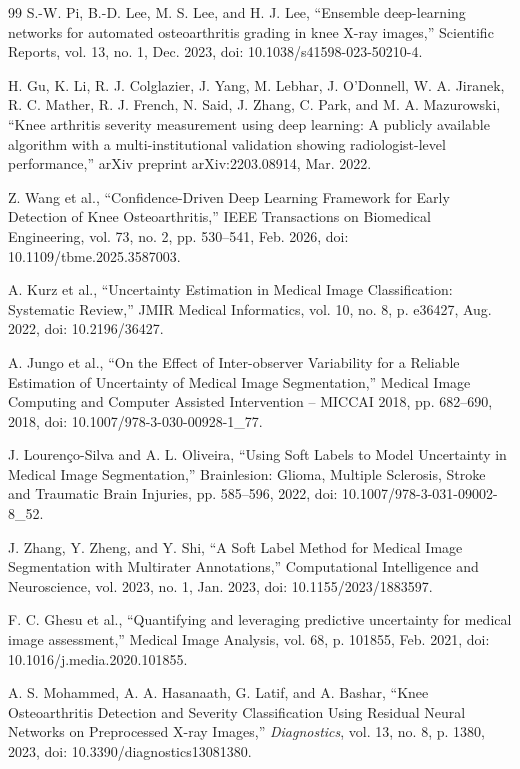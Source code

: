 \documentclass[letterpaper, 10 pt, conference]{ieeeconf}  %
\begin{document}
\begin{thebibliography}{99}
 S.-W. Pi, B.-D. Lee, M. S. Lee, and H. J. Lee, “Ensemble deep-learning networks for automated osteoarthritis grading in knee X-ray images,” Scientific Reports, vol. 13, no. 1, Dec. 2023, doi: 10.1038/s41598-023-50210-4.

 H. Gu, K. Li, R. J. Colglazier, J. Yang, M. Lebhar, J. O’Donnell, W. A. Jiranek, R. C. Mather, R. J. French, N. Said, J. Zhang, C. Park, and M. A. Mazurowski, “Knee arthritis severity measurement using deep learning: A publicly available algorithm with a multi-institutional validation showing radiologist-level performance,” arXiv preprint arXiv:2203.08914, Mar. 2022.

 Z. Wang et al., “Confidence-Driven Deep Learning Framework for Early Detection of Knee Osteoarthritis,” IEEE Transactions on Biomedical Engineering, vol. 73, no. 2, pp. 530–541, Feb. 2026, doi: 10.1109/tbme.2025.3587003.

 A. Kurz et al., “Uncertainty Estimation in Medical Image Classification: Systematic Review,” JMIR Medical Informatics, vol. 10, no. 8, p. e36427, Aug. 2022, doi: 10.2196/36427.

 A. Jungo et al., “On the Effect of Inter-observer Variability for a Reliable Estimation of Uncertainty of Medical Image Segmentation,” Medical Image Computing and Computer Assisted Intervention – MICCAI 2018, pp. 682–690, 2018, doi: 10.1007/978-3-030-00928-1\_77.

 J. Lourenço-Silva and A. L. Oliveira, “Using Soft Labels to Model Uncertainty in Medical Image Segmentation,” Brainlesion: Glioma, Multiple Sclerosis, Stroke and Traumatic Brain Injuries, pp. 585–596, 2022, doi: 10.1007/978-3-031-09002-8\_52.

 J. Zhang, Y. Zheng, and Y. Shi, “A Soft Label Method for Medical Image Segmentation with Multirater Annotations,” Computational Intelligence and Neuroscience, vol. 2023, no. 1, Jan. 2023, doi: 10.1155/2023/1883597.

 F. C. Ghesu et al., “Quantifying and leveraging predictive uncertainty for medical image assessment,” Medical Image Analysis, vol. 68, p. 101855, Feb. 2021, doi: 10.1016/j.media.2020.101855.

 A. S. Mohammed, A. A. Hasanaath, G. Latif, and A. Bashar, “Knee Osteoarthritis Detection and Severity Classification Using Residual Neural Networks on Preprocessed X-ray Images,” \textit{Diagnostics}, vol. 13, no. 8, p. 1380, 2023, doi: 10.3390/diagnostics13081380.


\end{thebibliography}
\end{document}
